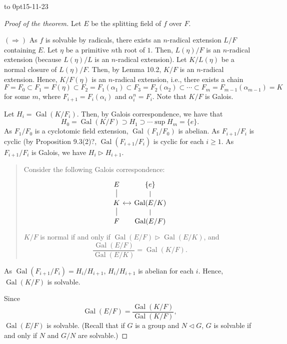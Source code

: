 \documentclass[twoside]{article}
\DeclareMathOperator\Gal{Gal}
\theoremstyle{remark}
\newcounter{theorem}
\newcommand*\newclass[1]{\par\vbox to 0pt{\hbox{\tiny\sffamily\color{gray}#1}} \par\ignorespaces}
\begin{document}
\newclass{15-11-23}

\begin{proof}[Proof of the theorem]
  Let \(E\) be the splitting field of \(f\) over \(F\).
  
  \((\Rightarrow)\) As \(f\) is solvable by radicals, there exists an \(n\)-radical extension \(L/F\) containing \(E\). Let \(\eta\) be a primitive \(n\)th root of \(1\). Then, \(L(\eta)/F\) is an \(n\)-radical extension (because \(L(\eta)/L\) is an \(n\)-radical extension). Let \(K/L(\eta)\) be a normal closure of \(L(\eta)/F\). Then, by Lemma 10.2, \(K/F\) is an \(n\)-radical extension. Hence, \(K/F(\eta)\) is an \(n\)-radical extension, i.e., there exists a chain
  \[ F = F_0 \subset F_1 = F(\eta) \subset F_2 = F_1(\alpha_1) \subset F_3 = F_2(\alpha_2) \subset \cdots \subset F_m = F_{m-1}(\alpha_{m-1}) = K \]
  for some \(m\), where \(F_{i+1} = F_i(\alpha_i)\) and \(\alpha_i^n = F_i\). Note that \(K/F\) is Galois.
  
  Let \(H_i = \Gal(K/F_i)\). Then, by Galois correspondence, we have that
  \[ H_0 = \Gal(K/F) \supset H_1 \supset \cdots \sup H_m = \{e\}. \]
  As \(F_1/F_0\) is a cyclotomic field extension, \(\Gal(F_1/F_0)\) is abelian. As \(F_{i+1}/F_i\) is cyclic (by Proposition 9.3(2)?, \(\Gal(F_{i+1}/F_i)\) is cyclic for each \(i \geq 1\). As \(F_{i+1}/F_i\) is Galois, we have \(H_i \vartriangleright H_{i+1}\).
  \begin{quote}\small
    Consider the following Galois correspondence:
    \begin{displaymath}
      \begin{tikzcd}[sep=small]
        E \dar[dash] & \{e\} \dar[dash] \\
        K \rar[<->]\dar[dash] & \Gal(E/K) \dar[dash] \\
        F & \Gal(E/F)
      \end{tikzcd}
    \end{displaymath}
    \(K/F\) is normal if and only if \(\Gal(E/F) \vartriangleright \Gal(E/K)\), and
    \[ \frac{\Gal(E/F)}{\Gal(E/K)} = \Gal(K/F). \]
  \end{quote}
  As \(\Gal(F_{i+1}/F_i) = H_i/H_{i+1}\), \(H_i/H_{i+1}\) is abelian for each \(i\). Hence, \(\Gal(K/F)\) is solvable.
  
  Since
  \[ \Gal(E/F) = \frac{\Gal(K/F)}{\Gal(K/F)}, \]
  \(\Gal(E/F)\) is solvable. (Recall that if \(G\) is a group and \(N \vartriangleleft G\), \(G\) is solvable if and only if \(N\) and \(G/N\) are solvable.) 
  

\end{proof}
\end{document}
